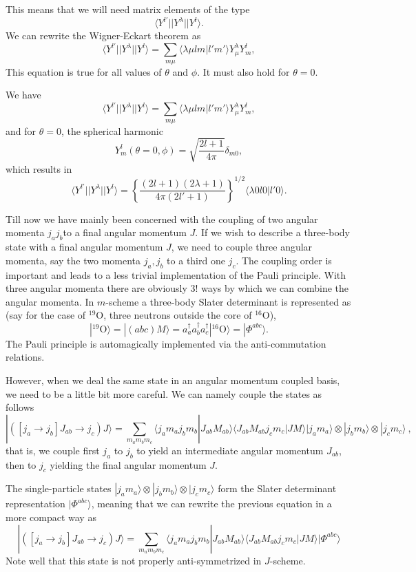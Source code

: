 {This means that we will need matrix elements of the type
\[
\langle Y^{l'}||Y^{\lambda}|| Y^{l}\rangle.
\]
We can rewrite the Wigner-Eckart theorem as 
\[
\langle Y^{l'}||Y^{\lambda}|| Y^{l}\rangle=\sum_{m\mu}\langle \lambda\mu lm|l'm'\rangle Y^{\lambda}_{\mu}Y^l_m,
\]
This equation is true for all values of $\theta$ and $\phi$. It must also hold for $\theta=0$.

We have 
\[
\langle Y^{l'}||Y^{\lambda}|| Y^{l}\rangle=\sum_{m\mu}\langle \lambda\mu lm|l'm'\rangle Y^{\lambda}_{\mu}Y^l_m,
\]
and for $\theta=0$, the spherical harmonic
\[
Y_m^l(\theta=0,\phi)=\sqrt{\frac{2l+1}{4\pi}}\delta_{m0}, 
\]
which results in 
\[
\langle Y^{l'}||Y^{\lambda}|| Y^{l}\rangle=\left\{\frac{(2l+1)(2\lambda+1)}{4\pi(2l'+1)}\right\}^{1/2}\langle \lambda0 l0|l'0\rangle.
\]
}

Till now we have mainly been concerned with the coupling of two angular momenta $j_aj_b$to a final angular momentum $J$.
If we wish to describe a three-body state with a final angular momentum $J$, we need to couple three angular momenta, say 
the two momenta $j_a,j_b$ to a third one $j_c$. The coupling order is important and leads to a less trivial implementation of the 
Pauli principle. With three angular momenta there are obviously $3!$ ways by which we can combine the angular momenta. \newline
In $m$-scheme a three-body Slater determinant is represented as (say for the case of $^{19}$O, three neutrons outside the core of $^{16}$O),
\[
|^{19}\mathrm{O}\rangle =|(abc)M\rangle  = a^{\dagger}_aa^{\dagger}_ba^{\dagger}_c|^{16}\mathrm{O}\rangle=|\Phi^{abc}\rangle.
\]
The Pauli principle is automagically implemented via the anti-commutation relations. 

However, when we deal the same state in an angular momentum coupled basis, we need to be a little bit more careful. We can namely couple the states
as follows
\[
| ([j_a\rightarrow j_b]J_{ab}\rightarrow j_c) J\rangle= \sum_{m_am_bm_c}\langle j_am_aj_bm_b|J_{ab}M_{ab}\rangle \langle J_{ab}M_{ab}j_cm_c|JM\rangle|j_am_a\rangle\otimes |j_bm_b\rangle \otimes |j_cm_c\rangle \ , \label{eq:fabc}
\]
that is, we couple first $j_a$ to $j_b$ to yield an intermediate angular momentum $J_{ab}$, then to $j_c$ yielding the final angular momentum $J$.

The single-particle states $|j_am_a\rangle\otimes |j_bm_b\rangle \otimes |j_cm_c\rangle$ form the Slater determinant representation
$|\Phi^{abc}\rangle$, meaning that we can rewrite the previous equation in a more compact way as 
\[
| ([j_a\rightarrow j_b]J_{ab}\rightarrow j_c) J\rangle =\sum_{m_am_bm_c}\langle j_am_aj_bm_b|J_{ab}M_{ab}\rangle \langle J_{ab}M_{ab}j_cm_c|JM\rangle |\Phi^{abc}\rangle
\]
Note well that this state is not properly anti-symmetrized in $J$-scheme.\newline

